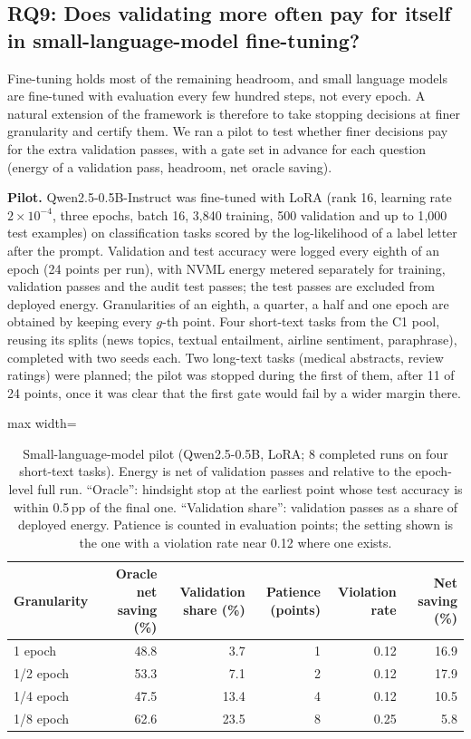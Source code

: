 \documentclass[3p,twocolumn,10pt]{elsarticle}
\theoremstyle{definition}
\begin{document}
\subsection{RQ9: Does validating more often pay for itself in small-language-model fine-tuning?}
\label{sec:slm}
Fine-tuning holds most of the remaining headroom, and small language models are fine-tuned with evaluation every few hundred steps, not every epoch. A natural extension of the framework is therefore to take stopping decisions at finer granularity and certify them. We ran a pilot to test whether finer decisions pay for the extra validation passes, with a gate set in advance for each question (energy of a validation pass, headroom, net oracle saving).

\textbf{Pilot.} Qwen2.5-0.5B-Instruct was fine-tuned with LoRA (rank 16, learning rate $2\times10^{-4}$, three epochs, batch 16, 3{,}840 training, 500 validation and up to 1{,}000 test examples) on classification tasks scored by the log-likelihood of a label letter after the prompt. Validation and test accuracy were logged every eighth of an epoch (24 points per run), with NVML energy metered separately for training, validation passes and the audit test passes; the test passes are excluded from deployed energy. Granularities of an eighth, a quarter, a half and one epoch are obtained by keeping every $g$-th point. Four short-text tasks from the C1 pool, reusing its splits (news topics, textual entailment, airline sentiment, paraphrase), completed with two seeds each. Two long-text tasks (medical abstracts, review ratings) were planned; the pilot was stopped during the first of them, after 11 of 24 points, once it was clear that the first gate would fail by a wider margin there.

\begin{table}[t]
\centering
\caption{Small-language-model pilot (Qwen2.5-0.5B, LoRA; 8 completed runs on four short-text tasks). Energy is net of validation passes and relative to the epoch-level full run. ``Oracle'': hindsight stop at the earliest point whose test accuracy is within 0.5\,pp of the final one. ``Validation share'': validation passes as a share of deployed energy. Patience is counted in evaluation points; the setting shown is the one with a violation rate near 0.12 where one exists.}
\label{tab:slm}
\footnotesize
\begin{adjustbox}{max width=\textwidth}
\begin{tabular}{lrrrrr}
\toprule
Granularity & Oracle net saving (\%) & Validation share (\%) & Patience (points) & Violation rate & Net saving (\%) \\
\midrule
1 epoch & 48.8 & 3.7 & 1 & 0.12 & 16.9 \\
1/2 epoch & 53.3 & 7.1 & 2 & 0.12 & 17.9 \\
1/4 epoch & 47.5 & 13.4 & 4 & 0.12 & 10.5 \\
1/8 epoch & 62.6 & 23.5 & 8 & 0.25 & 5.8 \\
\bottomrule
\end{tabular}
\end{adjustbox}
\end{table}
\end{document}
